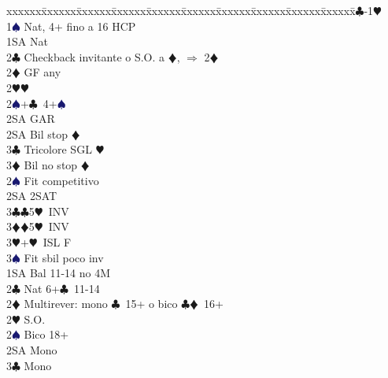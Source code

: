 \documentclass[a4paper,italian]{article}
\newcommand{\BC}{\textcolor{OliveGreen}{$\clubsuit$}}
\newcommand{\BD}{\textcolor{RedOrange}{$\vardiamondsuit$}}
\newcommand{\BH}{\textcolor{Red2}{$\varheartsuit${}}}
\newcommand{\BS}{\textcolor{MidnightBlue}{$\spadesuit${}}}
\newenvironment{bidtable}
{\begin{tabbing}

    xxxxxx\=xxxxxx\=xxxxxx\=xxxxxx\=xxxxxx\=xxxxxx\=xxxxxx\=xxxxxx\=xxxxxx\=xxxxxx\=\kill}
{\end{tabbing} }%
\begin{document}
\begin{multicols}{2}
                                    \begin{bidtable}
                                        1\BC-1\BH\+\\
                                        1\BS \> Nat, 4+ fino a 16 HCP\+\\
                                        1SA \> Nat\\
                                        2\BC \> Checkback invitante o S.O. a \BD , $\Rightarrow$ 2\BD \\
                                        2\BD \> GF any\+\\
                                        2\BH {}\BH \\
                                        2\BS {}+\BC\ 4+\BS \+\\
                                        2SA \> GAR\-\\
                                        2SA \> Bil stop \BD \\
                                        3\BC \> Tricolore SGL \BH \\
                                        3\BD \> Bil no stop \BD \-\\
                                        [2pt]2\BS \> Fit competitivo\\
                                        2SA \> 2SAT\\
                                        3\BC {}\BC 5\BH\ INV\\
                                        3\BD {}\BD 5\BH\ INV\\
                                        3\BH {}+\BH\ ISL F\\
                                        3\BS \> Fit sbil poco inv\-\\
                                        1SA \> Bal 11-14 no 4M\\
                                        2\BC \> Nat 6+\BC\ 11-14\\
                                        2\BD \> Multirever: mono \BC\ 15+ o bico \BC \BD\ 16+\+\\
                                        2\BH \> S.O.\+\\
                                        2\BS \> Bico 18+\\
                                        2SA\> Mono\\
                                        3\BC \> Mono\\

\end{bidtable}
\end{multicols}
\end{document}
